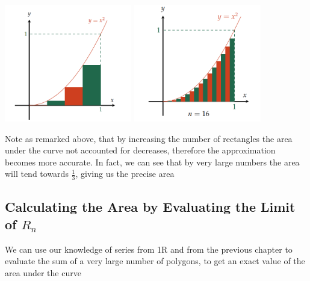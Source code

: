 \documentclass[english,course]{Notes}
\begin{document}
\begin{enumerate}
\includegraphics[width=15em]{area4strips2} \includegraphics[width=15em]{area16strips2}
	
\end{enumerate}

\par{Note as remarked above, that by increasing the number of rectangles the area under the curve not accounted for decreases, therefore the approximation becomes more accurate. In fact, we can see that by very large numbers the area will tend towards $\tfrac{1}{3}$, giving us the precise area}

\newpage
\subsection{Calculating the Area by Evaluating the Limit of $R_n$}

\par{We can use our knowledge of series from 1R and from the previous chapter to evaluate the sum of a very large number of polygons, to get an exact value of the area under the curve}
\end{document}
